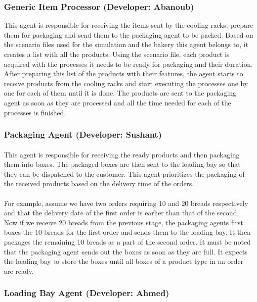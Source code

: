 \documentclass[11pt, a4paper]{article}
\begin{document}
\subsubsection{Generic Item Processor (Developer: Abanoub)}
This agent is responsible for receiving the items sent by the cooling racks, prepare them for packaging and send them to the packaging agent to be packed. Based on the scenario files used for the simulation and the bakery this agent belongs to, it creates a list with all the products. Using the scenario file, each product is acquired with the processes it needs to be ready for packaging and their duration. After preparing this list of the products with their features, the agent starts to receive products from the cooling racks and start executing the processes one by one for each of them until it is done. The products are sent to the packaging agent as soon as they are processed and all the time needed for each of the processes is finished.
\subsubsection{Packaging Agent (Developer: Sushant)}
\paragraph{}
This agent is responsible for receiving the ready products and then packaging them into boxes. The packaged boxes are then sent to the loading bay so that they can be dispatched to the customer. This agent prioritizes the packaging of the received products based on the delivery time of the orders. 
\paragraph{}
For example, assume we have two orders requiring 10 and 20 breads respectively and that the delivery date of the first order is earlier than that of the second. Now if we receive 20 breads from the previous stage, the packaging agents first boxes the 10 breads for the first order and sends them to the loading bay. It then packages the remaining 10 breads as a part of the second order. It must be noted that the packaging agent sends out the boxes as soon as they are full. It expects the loading bay to store the boxes until all boxes of a product type in an order are ready.

\subsubsection{Loading Bay Agent (Developer: Ahmed)}
\end{document}
